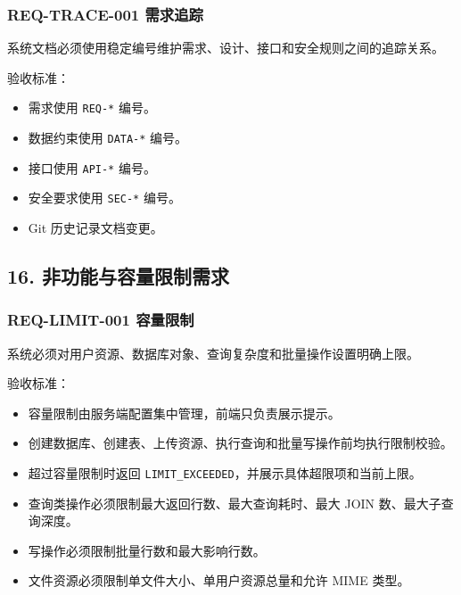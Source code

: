 \documentclass[
  a4paper,
  UTF8]{ctexart}
\providecommand{\tightlist}{%
  \setlength{\itemsep}{0pt}\setlength{\parskip}{0pt}}
\begin{document}
\hypertarget{req-trace-001-ux9700ux6c42ux8ffdux8e2a}{%
\subsubsection{REQ-TRACE-001
需求追踪}\label{req-trace-001-ux9700ux6c42ux8ffdux8e2a}}

系统文档必须使用稳定编号维护需求、设计、接口和安全规则之间的追踪关系。

验收标准：

\begin{itemize}
\tightlist
\item
  需求使用 \texttt{REQ-*} 编号。
\item
  数据约束使用 \texttt{DATA-*} 编号。
\item
  接口使用 \texttt{API-*} 编号。
\item
  安全要求使用 \texttt{SEC-*} 编号。
\item
  Git 历史记录文档变更。
\end{itemize}

\hypertarget{ux975eux529fux80fdux4e0eux5bb9ux91cfux9650ux5236ux9700ux6c42}{%
\subsection{16.
非功能与容量限制需求}\label{ux975eux529fux80fdux4e0eux5bb9ux91cfux9650ux5236ux9700ux6c42}}

\hypertarget{req-limit-001-ux5bb9ux91cfux9650ux5236}{%
\subsubsection{REQ-LIMIT-001
容量限制}\label{req-limit-001-ux5bb9ux91cfux9650ux5236}}

系统必须对用户资源、数据库对象、查询复杂度和批量操作设置明确上限。

验收标准：

\begin{itemize}
\tightlist
\item
  容量限制由服务端配置集中管理，前端只负责展示提示。
\item
  创建数据库、创建表、上传资源、执行查询和批量写操作前均执行限制校验。
\item
  超过容量限制时返回
  \texttt{LIMIT\_EXCEEDED}，并展示具体超限项和当前上限。
\item
  查询类操作必须限制最大返回行数、最大查询耗时、最大 JOIN
  数、最大子查询深度。
\item
  写操作必须限制批量行数和最大影响行数。
\item
  文件资源必须限制单文件大小、单用户资源总量和允许 MIME 类型。
\end{itemize}
\end{document}
